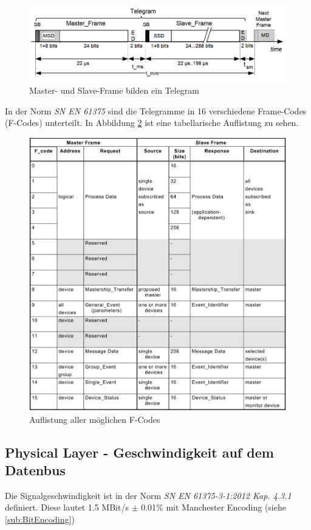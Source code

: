 \begin{figure}[H]
    \centering
    \includegraphics[width=0.85\linewidth]{Figures/Chap2/Grundlagen/MVB_DOKU/Frames und Telegramme/Fig39_Telegamm_definition.png}
    \caption{Master- und Slave-Frame bilden ein Telegram}
    \label{fig:Fig39_Telegamm_definition.png}
\end{figure}

In der Norm \textit{SN EN 61375} sind die Telegramme in 16 verschiedene Frame-Codes (F-Codes) unterteilt. In Abbildung \ref{fig:FCodeListe} ist eine tabellarische Auflistung zu sehen. 

\begin{figure}[H]
    \centering
    \includegraphics[width=0.9\linewidth]{Figures/Chap2/Grundlagen/MVB_DOKU/Frames und Telegramme/F-Code Liste.png}
    \caption{Auflistung aller möglichen F-Codes}
    \label{fig:FCodeListe}
\end{figure}

\subsection{Physical Layer - Geschwindigkeit auf dem Datenbus}
\label{sub:GeschwindigkeitDatenbus}
Die Signalgeschwindigkeit ist in der Norm \textit{SN EN 61375-3-1:2012 Kap. 4.3.1} definiert. Diese lautet 1.5 MBit/s $\pm$ 0.01\% mit Manchester Encoding (siehe \ref{sub:BitEncoding})


